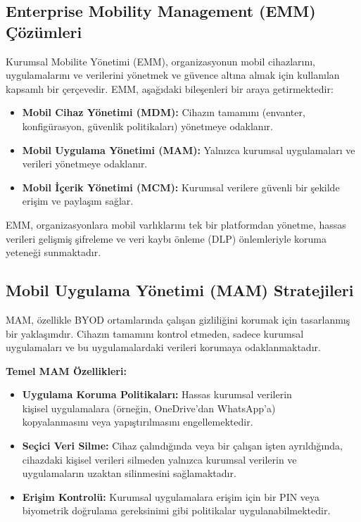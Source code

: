 \subsection{Enterprise Mobility Management (EMM) Çözümleri}

Kurumsal Mobilite Yönetimi (EMM), organizasyonun mobil cihazlarını, uygulamalarını ve verilerini yönetmek ve güvence altına almak için kullanılan kapsamlı bir çerçevedir. EMM, aşağıdaki bileşenleri bir araya getirmektedir:

\begin{itemize}
    \item \textbf{Mobil Cihaz Yönetimi (MDM):} Cihazın tamamını (envanter, konfigürasyon, güvenlik politikaları) yönetmeye odaklanır.
    \item \textbf{Mobil Uygulama Yönetimi (MAM):} Yalnızca kurumsal uygulamaları ve verileri yönetmeye odaklanır.
    \item \textbf{Mobil İçerik Yönetimi (MCM):} Kurumsal verilere güvenli bir şekilde erişim ve paylaşım sağlar.
\end{itemize}

EMM, organizasyonlara mobil varlıklarını tek bir platformdan yönetme, hassas verileri gelişmiş şifreleme ve veri kaybı önleme (DLP) önlemleriyle koruma yeteneği sunmaktadır.

\subsection{Mobil Uygulama Yönetimi (MAM) Stratejileri}

MAM, özellikle BYOD ortamlarında çalışan gizliliğini korumak için tasarlanmış bir yaklaşımdır. Cihazın tamamını kontrol etmeden, sadece kurumsal uygulamaları ve bu uygulamalardaki verileri korumaya odaklanmaktadır.

\textbf{Temel MAM Özellikleri:}
\begin{itemize}
    \item \textbf{Uygulama Koruma Politikaları:} Hassas kurumsal verilerin \\
    kişisel uygulamalara (örneğin, OneDrive'dan WhatsApp'a) \\
    kopyalanmasını veya yapıştırılmasını engellemektedir.
    \item \textbf{Seçici Veri Silme:} Cihaz çalındığında veya bir çalışan işten ayrıldığında, cihazdaki kişisel verileri silmeden yalnızca kurumsal verilerin ve uygulamaların uzaktan silinmesini sağlamaktadır.
    \item \textbf{Erişim Kontrolü:} Kurumsal uygulamalara erişim için bir PIN veya biyometrik doğrulama gereksinimi gibi politikalar uygulanabilmektedir.
\end{itemize}

